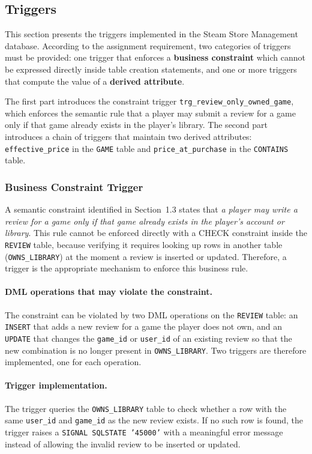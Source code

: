\subsection{Triggers}

This section presents the triggers implemented in the Steam Store Management database. According to the assignment requirement, two categories of triggers must be provided: one trigger that enforces a \textbf{business constraint} which cannot be expressed directly inside table creation statements, and one or more triggers that compute the value of a \textbf{derived attribute}.

The first part introduces the constraint trigger \texttt{trg\_review\_only\_owned\_game}, which enforces the semantic rule that a player may submit a review for a game only if that game already exists in the player's library. The second part introduces a chain of triggers that maintain two derived attributes: \texttt{effective\_price} in the \texttt{GAME} table and \texttt{price\_at\_purchase} in the \texttt{CONTAINS} table.

\subsubsection{Business Constraint Trigger}

A semantic constraint identified in Section~1.3 states that \emph{a player may write a review for a game only if that game already exists in the player's account or library}. This rule cannot be enforced directly with a CHECK constraint inside the \texttt{REVIEW} table, because verifying it requires looking up rows in another table (\texttt{OWNS\_LIBRARY}) at the moment a review is inserted or updated. Therefore, a trigger is the appropriate mechanism to enforce this business rule.

\paragraph{DML operations that may violate the constraint.}
The constraint can be violated by two DML operations on the \texttt{REVIEW} table: an \texttt{INSERT} that adds a new review for a game the player does not own, and an \texttt{UPDATE} that changes the \texttt{game\_id} or \texttt{user\_id} of an existing review so that the new combination is no longer present in \texttt{OWNS\_LIBRARY}. Two triggers are therefore implemented, one for each operation.

\paragraph{Trigger implementation.}
The trigger queries the \texttt{OWNS\_LIBRARY} table to check whether a row with the same \texttt{user\_id} and \texttt{game\_id} as the new review exists. If no such row is found, the trigger raises a \texttt{SIGNAL SQLSTATE '45000'} with a meaningful error message instead of allowing the invalid review to be inserted or updated.

